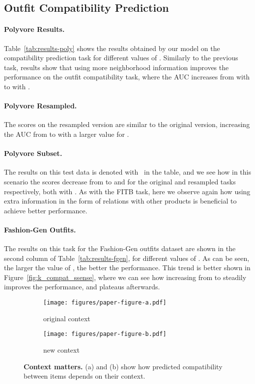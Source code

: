 \documentclass[10pt,twocolumn,letterpaper]{article}
\begin{document}
\subsection{Outfit Compatibility Prediction} \label{sec:compat_results}

\paragraph{Polyvore Results.} 
Table~\ref{tab:results-poly} shows the results obtained by our model on the compatibility prediction task for different values of . 
Similarly to the previous task, results show that using more neighborhood information improves the performance on the outfit compatibility task, where the 
AUC increases from  with  to  with .

\paragraph{Polyvore Resampled.} 
The scores on the resampled version are similar to the original version, increasing the AUC from  to  with a larger value for .

\paragraph{Polyvore Subset.} The results on this test data is denoted with \textdagger ~in the table, and we see how in this scenario the scores decrease from  to  and  for the original and resampled tasks respectively, both with .
As with the FITB task, here we observe again how using extra information in the form of relations with other products is beneficial to achieve better performance. 

\paragraph{Fashion-Gen Outfits.} 
The results on this task for the Fashion-Gen outfits dataset are shown in the second column of Table~\ref{tab:results-fgen}, for different values of . As can be seen, the larger the value of , the better the performance. This trend is better shown in Figure~\ref{fig:k_compat_ssense}, where we can see how increasing  from  to  steadily improves the performance, and plateaus afterwards.

\begin{figure}[t]
\begin{center}
\begin{subfigure}{.40\textwidth}
  \centering
  \texttt{[image: figures/paper-figure-a.pdf]}
  \caption{original context}
  \label{fig:context_a}
\end{subfigure}
\begin{subfigure}{.40\textwidth}
  \centering
  \texttt{[image: figures/paper-figure-b.pdf]}
  \caption{new context}
  \label{fig:context_b}
\end{subfigure}\end{center}
\caption{\textbf{Context matters.} (a) and (b) show how predicted compatibility between items depends on their context.}
\label{fig:context}
\end{figure}
\end{document}
